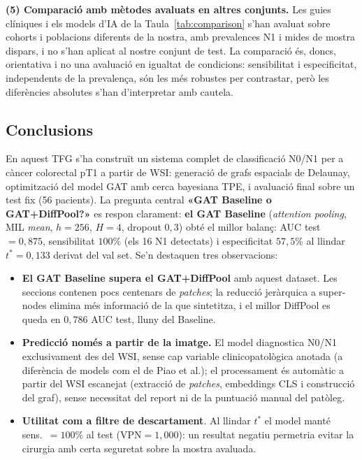 \documentclass[10pt,a4paper,twocolumn,twoside]{article}
\begin{document}
\textbf{(5) Comparació amb mètodes avaluats en altres conjunts.}
Les guies clíniques i els models d'IA de la Taula~\ref{tab:comparison} s'han avaluat sobre
cohorts i poblacions diferents de la nostra, amb prevalences N1 i mides de mostra dispars, i
no s'han aplicat al nostre conjunt de test. La comparació és, doncs, orientativa i no
una avaluació en igualtat de condicions: sensibilitat i especificitat, independents de la
prevalença, són les més robustes per contrastar, però les diferències absolutes s'han
d'interpretar amb cautela.

\subsection{Conclusions}

En aquest TFG s'ha construït un sistema complet de classificació N0/N1 per a càncer
colorectal pT1 a partir de WSI: generació de grafs espacials de Delaunay, optimització
del model GAT amb cerca bayesiana TPE, i avaluació final sobre un test fix (56 pacients).
La pregunta central \textbf{«GAT Baseline o GAT+DiffPool?»} es respon clarament:
\textbf{el GAT Baseline} (\textit{attention pooling}, MIL \textit{mean}, $h\!=\!256$,
$H\!=\!4$, dropout $0{,}3$) obté el millor balanç: AUC test $=0{,}875$, sensibilitat
$100\%$ (els 16 N1 detectats) i especificitat $57{,}5\%$ al llindar $t^*\!=\!0{,}133$
derivat del val set. Se'n destaquen tres observacions:

\begin{itemize}
  \item \textbf{El GAT Baseline supera el GAT+DiffPool} amb aquest dataset. Les seccions
  contenen pocs centenars de \textit{patches}; la reducció jeràrquica a super-nodes
  elimina més informació de la que sintetitza, i el millor DiffPool es queda en
  $0{,}786$ AUC test, lluny del Baseline.
  \item \textbf{Predicció només a partir de la imatge.} El model diagnostica N0/N1
  exclusivament des del WSI, sense cap variable clinicopatològica anotada (a diferència de
  models com el de Piao et al.); el processament és automàtic a partir del WSI escanejat
  (extracció de \textit{patches}, embeddings CLS i construcció del graf), sense necessitat
  del report ni de la puntuació manual del patòleg.
  \item \textbf{Utilitat com a filtre de descartament}. Al llindar $t^*$ el model manté
  sens.\ $=100\%$ al test ($\text{VPN}\!=\!1{,}000$): un resultat negatiu permetria evitar
  la cirurgia amb certa seguretat sobre la mostra avaluada.
\end{itemize}
\end{document}
